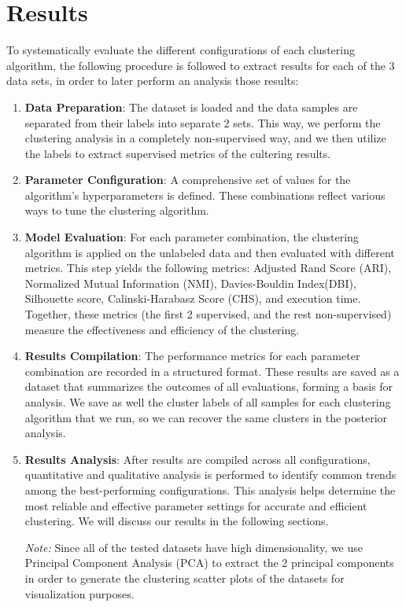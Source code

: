 \section{Results}\label{sec:results}
To systematically evaluate the different configurations of each clustering algorithm, the following procedure is followed to extract results for each of the 3 data sets, in order to later perform an analysis those results:

\begin{enumerate}
    \item \textbf{Data Preparation}: The dataset is loaded and the data samples are separated from their labels into separate 2 sets. This way, we perform the clustering analysis in a completely non-supervised way, and we then utilize the labels to extract supervised metrics of the cultering results.

    \item \textbf{Parameter Configuration}: A comprehensive set of values for the algorithm's hyperparameters is defined. These combinations reflect various ways to tune the clustering algorithm.

    \item \textbf{Model Evaluation}: For each parameter combination, the clustering algorithm is applied on the unlabeled data and then evaluated with different metrics. This step yields the following metrics: Adjusted Rand Score (ARI), Normalized Mutual Information (NMI), Davies-Bouldin Index(DBI), Silhouette score, Calinski-Harabasz Score (CHS), and execution time. Together, these metrics (the first 2 supervised, and the rest non-supervised) measure the effectiveness and efficiency of the clustering.

    \item \textbf{Results Compilation}: The performance metrics for each parameter combination are recorded in a structured format. These results are saved as a dataset that summarizes the outcomes of all evaluations, forming a basis for analysis. We save as well the cluster labels of all samples for each clustering algorithm that we run, so we can recover the same clusters in the posterior analysis.

    \item \textbf{Results Analysis}: After results are compiled across all configurations, quantitative and qualitative analysis is performed to identify common trends among the best-performing configurations. This analysis helps determine the most reliable and effective parameter settings for accurate and efficient clustering. We will discuss our results in the following sections.
    
    \textit{Note:} Since all of the tested datasets have high dimensionality, we use Principal Component Analysis (PCA) to extract the 2 principal components in order to generate the clustering scatter plots of the datasets for visualization purposes.
\end{enumerate}

